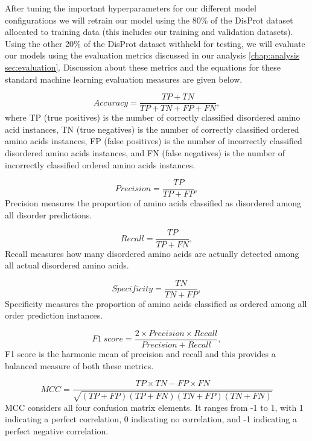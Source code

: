 \documentclass{l4proj}
\begin{document}
After tuning the important hyperparameters for our different model configurations we will retrain our model using the 80\% of the DisProt dataset allocated to training data (this includes our training and validation datasets). Using the other 20\% of the DisProt dataset withheld for testing, we will evaluate our models using the evaluation metrics discussed in our analysis \ref{chap:analysis sec:evaluation}. Discussion about these metrics and the equations for these standard machine learning evaluation measures are given below. 

\begin{equation*}
Accuracy = \frac{TP + TN}{TP + TN + FP + FN} ,
\end{equation*}
where TP (true positives) is the number of correctly classified disordered amino acid instances, TN (true negatives) is the number of correctly classified ordered amino acids instances, FP (false positives) is the number of incorrectly classified disordered amino acids instances, and FN (false negatives) is the number of incorrectly classified ordered amino acids instances.

\begin{equation*}
Precision = \frac{TP}{TP + FP} ,
\end{equation*}
Precision measures the proportion of amino acids classified as disordered among all disorder predictions.

\begin{equation*}
Recall = \frac{TP}{TP + FN} ,
\end{equation*}
Recall measures how many disordered amino acids are actually detected among all actual disordered amino acids.

\begin{equation*}
Specificity = \frac{TN}{TN + FP} ,
\end{equation*}
Specificity measures the proportion of amino acids classified as ordered among all order prediction instances.

\begin{equation*}
F1\ score = \frac{2 \times Precision \times Recall}{Precision + Recall} ,
\end{equation*}
F1 score is the harmonic mean of precision and recall and this provides a balanced measure of both these metrics.

\begin{equation*}
MCC = \frac{TP \times TN - FP \times FN}{\sqrt{(TP + FP)(TP + FN)(TN + FP)(TN + FN)}}
\end{equation*}
MCC considers all four confusion matrix elements. It ranges from -1 to 1, with 1 indicating a perfect correlation, 0 indicating no correlation, and -1 indicating a perfect negative correlation.
\end{document}
